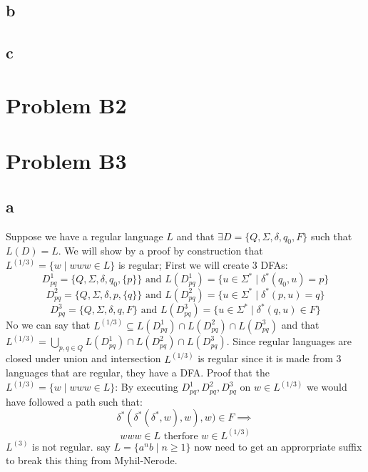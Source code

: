 \documentclass[12pt]{article}
\begin{document}
\subsection*{b}

\subsection*{c}

\section*{Problem B2}

\section*{Problem B3}
\subsection*{a}
Suppose we have a regular language $L$ and that $\exists    D = \{Q, \Sigma, \delta, q_0, F\}$ such that $L(D) = L$. We will show by a proof by construction that $L^{(1/3)} = \{ w \mid www \in L\}$ is regular; \newline First we will create 3 DFAs:
$$D^1_{pq} = \{Q, \Sigma, \delta, q_0, \{p\}\} \text{ and } L(D^1_{pq}) = \{u \in \Sigma^* \mid \delta^* (q_0,u) = p\}$$
$$D^2_{pq} = \{Q, \Sigma, \delta, p, \{q\}\} \text{ and } L(D^2_{pq}) = \{u \in \Sigma^* \mid \delta^* (p,u) = q\}$$
$$D^3_{pq} = \{Q, \Sigma, \delta, q, F\} \text{ and } L(D^3_{pq}) = \{u \in \Sigma^* \mid \delta^* (q,u) \in F\}$$
No we can say that $L^{(1/3)} \subseteq L(D^1_{pq}) \cap L(D^2_{pq}) \cap L(D^3_{pq})$ and that $L^{(1/3)} = \bigcup_{p,q \in Q}  L(D^1_{pq}) \cap L(D^2_{pq}) \cap L(D^3_{pq})$.  Since regular languages are closed under union and intersection $L^{(1/3)}$ is regular since it is made from 3 languages that are regular, they have a DFA. \newline
Proof that the $L^{(1/3)} = \{ w \mid www \in L\}$:\newline
By executing  $D^1_{pq} , D^2_{pq} , D^3_{pq}$ on $w \in L^{(1/3)}$ we would have followed a path such that:
$$\delta^*(\delta^*(\delta^*, w), w), w) \in F \implies$$
$$www \in L \text{ therfore }w \in L^{(1/3)}$$
\newline $L^{(3)}$ is not regular. say $L = \{a^nb \mid n \ge 1\}$ now need to get an approrpriate suffix to break this thing from Myhil-Nerode.
\end{document}
